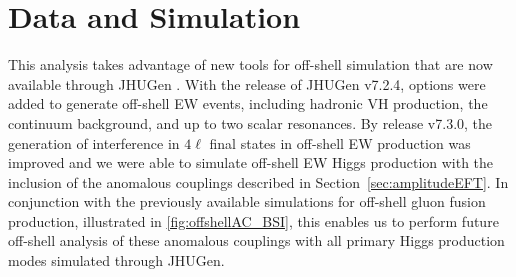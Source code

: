 



\section{Data and Simulation}


This analysis takes advantage of new tools for off-shell simulation that are now available through JHUGen \cite{2010,2012,2014,2016,2020,2021}. With the release of JHUGen v7.2.4, options were added to generate off-shell EW events, including hadronic VH production, the continuum background, and up to two scalar resonances. By release v7.3.0, the generation of interference in $4\ell$ final states in off-shell EW production was improved and we were able to simulate off-shell EW Higgs production with the inclusion of the anomalous couplings described in Section~\ref{sec:amplitudeEFT}. In conjunction with the previously available simulations for off-shell gluon fusion production, illustrated in \ref{fig:offshellAC_BSI}, this enables us to perform future off-shell analysis of these anomalous couplings with all primary Higgs production modes simulated through JHUGen. 

